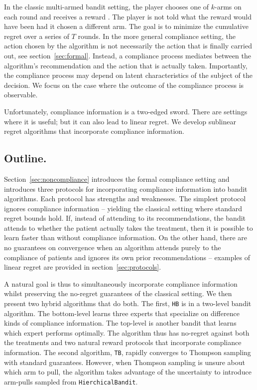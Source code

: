 In the classic multi-armed bandit setting, the player chooses one of $k$-arms on each round and receives a reward \cite{auer:02b,auer:02}. The player is not told what the reward would have been had it chosen a different arm. The goal is to minimize the cumulative regret over a series of $T$ rounds. In the more general compliance setting, the action chosen by the algorithm is not necessarily the action that is finally carried out, see section~\ref{sec:formal}. Instead, a compliance process mediates between the algorithm's recommendation and the action that is actually taken. Importantly, the compliance process may depend on latent characteristics of the subject of the decision. We focus on the case where the outcome of the compliance process is observable.

Unfortunately, compliance information is a two-edged sword. There are settings where it is useful; but  it can also lead to linear regret. We develop sublinear regret algorithms that incorporate compliance information.


\subsection{Outline.}
Section~\ref{sec:noncompliance} introduces the formal compliance setting and introduces three protocols for incorporating compliance information into bandit algorithms. Each protocol has strengths and weaknesses. The simplest protocol ignores compliance information -- yielding the classical setting where standard regret bounds hold. If, instead of attending to its recommendations, the bandit attends to whether the patient actually takes the treatment, then it is possible to learn faster than without compliance information. On the other hand, there are no guarantees on convergence when an algorithm attends purely to the compliance of patients and ignores its own prior recommendations -- examples of linear regret are provided in section~\ref{sec:protocols}. 

A natural goal is thus to simultaneously incorporate compliance information whilst preserving the no-regret guarantees of the classical setting. We then present two hybrid algorithms that do both. The first, \texttt{HB} is in a two-level bandit algorithm. The bottom-level learns three experts that specialize on difference kinds of compliance information. The top-level is another bandit that learns which expert performs optimally. The algorithm thus has no-regret against both the treatments and two natural reward protocols that incorporate compliance information. The second algorithm, \texttt{TB}, rapidly converges to Thompson sampling with standard guarantees. However, when Thompson sampling is unsure about which arm to pull, the algorithm takes advantage of the uncertainty to introduce arm-pulls sampled from \texttt{HierchicalBandit}.

